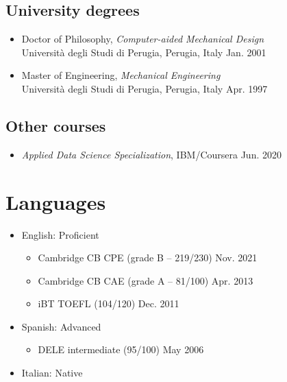 \documentclass[11pt]{article}
\begin{document}
\subsection*{University degrees}

\begin{itemize}
\item Doctor of Philosophy, 
\emph{Computer-aided Mechanical Design} \\ 
Università degli Studi di Perugia, Perugia, Italy \hfill Jan. 2001 

\item Master of Engineering, \emph{Mechanical Engineering} \\ 
Università degli Studi di Perugia, Perugia, Italy \hfill Apr. 1997
\end{itemize}

\subsection*{Other courses}

\begin{itemize}

\item 
\emph{Applied Data Science Specialization}, IBM/Coursera \hfill Jun. 2020

\end{itemize}

\section*{Languages} 

\begin{itemize}

	\item English: Proficient
	\begin{itemize}
		\item Cambridge CB CPE (grade B -- 219/230) \hfill Nov. 2021
		\item Cambridge CB CAE (grade A -- 81/100) \hfill Apr. 2013
		\item iBT TOEFL (104/120) \hfill Dec. 2011
	\end{itemize}
	\item Spanish: Advanced
	\begin{itemize}
		\item DELE intermediate (95/100) \hfill May 2006
	\end{itemize}\textbf{}
	\item Italian: Native
	
\end{itemize}
\end{document}
